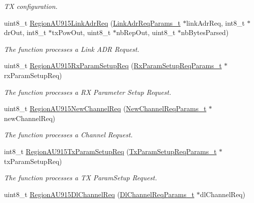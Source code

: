 \begin{DoxyCompactItemize}
\begin{DoxyCompactList}\small\item\em TX configuration. \end{DoxyCompactList}\item 
uint8\+\_\+t \mbox{\hyperlink{group___r_e_g_i_o_n_a_u915_ga2614037d99a37bdd1d3d7df1a3361201}{Region\+A\+U915\+Link\+Adr\+Req}} (\mbox{\hyperlink{group___r_e_g_i_o_n_gad4af503e8d4de1846129e26a799a1e8e}{Link\+Adr\+Req\+Params\+\_\+t}} $\ast$link\+Adr\+Req, int8\+\_\+t $\ast$dr\+Out, int8\+\_\+t $\ast$tx\+Pow\+Out, uint8\+\_\+t $\ast$nb\+Rep\+Out, uint8\+\_\+t $\ast$nb\+Bytes\+Parsed)
\begin{DoxyCompactList}\small\item\em The function processes a Link A\+DR Request. \end{DoxyCompactList}\item 
uint8\+\_\+t \mbox{\hyperlink{group___r_e_g_i_o_n_a_u915_ga865421723c0e1878fc94a151e95e6ee3}{Region\+A\+U915\+Rx\+Param\+Setup\+Req}} (\mbox{\hyperlink{group___r_e_g_i_o_n_ga7165f282c670c728c36d534df2285157}{Rx\+Param\+Setup\+Req\+Params\+\_\+t}} $\ast$rx\+Param\+Setup\+Req)
\begin{DoxyCompactList}\small\item\em The function processes a RX Parameter Setup Request. \end{DoxyCompactList}\item 
uint8\+\_\+t \mbox{\hyperlink{group___r_e_g_i_o_n_a_u915_gab50eb32c1a156ee9629976c7bf29967c}{Region\+A\+U915\+New\+Channel\+Req}} (\mbox{\hyperlink{group___r_e_g_i_o_n_gae2abcdb6dbb843c9faf5fd3009eca9d6}{New\+Channel\+Req\+Params\+\_\+t}} $\ast$new\+Channel\+Req)
\begin{DoxyCompactList}\small\item\em The function processes a Channel Request. \end{DoxyCompactList}\item 
int8\+\_\+t \mbox{\hyperlink{group___r_e_g_i_o_n_a_u915_gaa6db7d4c1d3b1e547aa00c13e1d31b08}{Region\+A\+U915\+Tx\+Param\+Setup\+Req}} (\mbox{\hyperlink{group___r_e_g_i_o_n_ga26836ef2996e70410e42ef471073f855}{Tx\+Param\+Setup\+Req\+Params\+\_\+t}} $\ast$tx\+Param\+Setup\+Req)
\begin{DoxyCompactList}\small\item\em The function processes a TX Param\+Setup Request. \end{DoxyCompactList}\item 
uint8\+\_\+t \mbox{\hyperlink{group___r_e_g_i_o_n_a_u915_ga8568053064f5db87978653f9fd218177}{Region\+A\+U915\+Dl\+Channel\+Req}} (\mbox{\hyperlink{group___r_e_g_i_o_n_gae0d608ff1f8ea0a430e4f9a4c38ec7f3}{Dl\+Channel\+Req\+Params\+\_\+t}} $\ast$dl\+Channel\+Req)

\end{DoxyCompactItemize}
